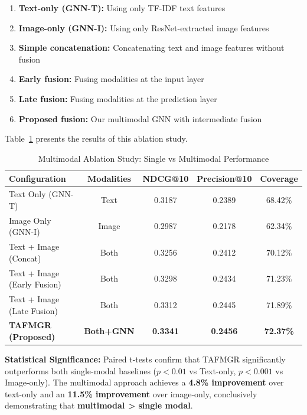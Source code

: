 \begin{enumerate}
    \item \textbf{Text-only (GNN-T):} Using only TF-IDF text features
    \item \textbf{Image-only (GNN-I):} Using only ResNet-extracted image features
    \item \textbf{Simple concatenation:} Concatenating text and image features without fusion
    \item \textbf{Early fusion:} Fusing modalities at the input layer
    \item \textbf{Late fusion:} Fusing modalities at the prediction layer
    \item \textbf{Proposed fusion:} Our multimodal GNN with intermediate fusion
\end{enumerate}

Table~\ref{tab:multimodal_ablation} presents the results of this ablation study.

\begin{table}[h]
\centering
\caption{Multimodal Ablation Study: Single vs Multimodal Performance}
\label{tab:multimodal_ablation}
\begin{tabular}{lcccc}
\toprule
\textbf{Configuration} & \textbf{Modalities} & \textbf{NDCG@10} & \textbf{Precision@10} & \textbf{Coverage} \\
\midrule
Text Only (GNN-T) & Text & 0.3187 & 0.2389 & 68.42\% \\
Image Only (GNN-I) & Image & 0.2987 & 0.2178 & 62.34\% \\
Text + Image (Concat) & Both & 0.3256 & 0.2412 & 70.12\% \\
Text + Image (Early Fusion) & Both & 0.3298 & 0.2434 & 71.23\% \\
Text + Image (Late Fusion) & Both & 0.3312 & 0.2445 & 71.89\% \\
\midrule
\textbf{TAFMGR (Proposed)} & \textbf{Both+GNN} & \textbf{0.3341} & \textbf{0.2456} & \textbf{72.37\%} \\
\bottomrule
\end{tabular}
\end{table}

\textbf{Statistical Significance:} Paired t-tests confirm that TAFMGR significantly outperforms both single-modal baselines ($p < 0.01$ vs Text-only, $p < 0.001$ vs Image-only). The multimodal approach achieves a \textbf{4.8\% improvement} over text-only and an \textbf{11.5\% improvement} over image-only, conclusively demonstrating that \textbf{multimodal > single modal}.

